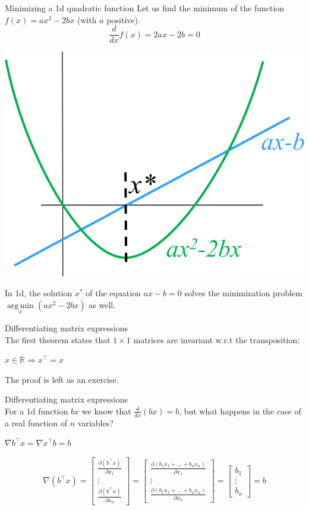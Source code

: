 \documentclass[UKenglish,aspectratio=169]{beamer}
\DeclareMathOperator*{\argmin}{arg\,min}
\begin{document}
\begin{frame}{Minimizing a 1d quadratic function}
Let us find the minimum of the function $f(x) = ax^2 - 2bx$ (with $a$ positive).
$$\frac{d}{dx}f(x) = 2ax - 2b = 0$$
\pause
\begin{center}
\includegraphics[width=.3\linewidth]{../manuscript/img/minpb1d}
\end{center}
In 1d, the solution $x^*$ of the equation $ax - b = 0$ solves the minimization problem $\argmin\limits_x(ax^2-2bx)$ as well.
\end{frame}

\begin{frame}{Differentiating matrix expressions}
~\\
The first theorem states that $1\times 1$ matrices are invariant w.r.t the transposition:
\begin{theorem}
$x\in \mathbb R \Rightarrow x^\top = x$
\end{theorem}
The proof is left as an exercise.
\end{frame}

\begin{frame}{Differentiating matrix expressions}
~\\
For a 1d function $bx$ we know that $\frac{d}{dx}(bx) = b$, but what happens in the case of a real function of $n$ variables?
\begin{theorem}
$\nabla b^\top x = \nabla x^\top b = b$
\end{theorem}
\pause
$$\nabla(b^\top x) = \begin{bmatrix}\frac{\partial (b^\top x)}{\partial x_1} \\ \vdots \\ \frac{\partial (b^\top x)}{\partial x_n} \end{bmatrix} = \begin{bmatrix}\frac{\partial (b_1 x_1 + \dots + b_n x_n)}{\partial x_1} \\ \vdots \\ \frac{\partial (b_1 x_1 + \dots + b_n x_n)}{\partial x_n} \end{bmatrix} = \begin{bmatrix}b_1 \\ \vdots \\ b_n \end{bmatrix} = b$$
\end{frame}
\end{document}
